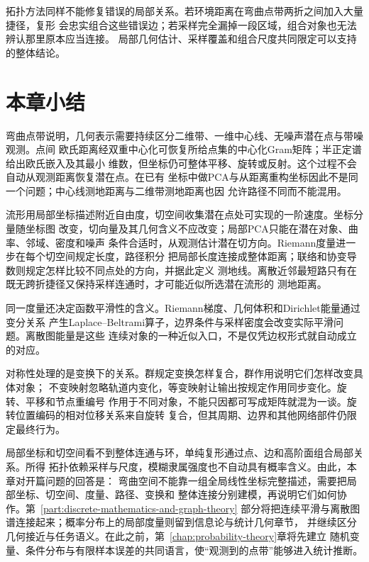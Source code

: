 拓扑方法同样不能修复错误的局部关系。若环境距离在弯曲点带两折之间加入大量捷径，复形
会忠实组合这些错误边；若采样完全漏掉一段区域，组合对象也无法辨认那里原本应当连接。
局部几何估计、采样覆盖和组合尺度共同限定可以支持的整体结论。

\section{本章小结}
\label{sec:geometry-summary}

弯曲点带说明，几何表示需要持续区分二维带、一维中心线、无噪声潜在点与带噪观测。点间
欧氏距离经双重中心化可恢复所给点集的中心化Gram矩阵；半正定谱给出欧氏嵌入及其最小
维数，但坐标仍可整体平移、旋转或反射。这个过程不会自动从观测距离恢复潜在点。在已有
坐标中做PCA与从距离重构坐标因此不是同一个问题；中心线测地距离与二维带测地距离也因
允许路径不同而不能混用。

流形用局部坐标描述附近自由度，切空间收集潜在点处可实现的一阶速度。坐标分量随坐标图
改变，切向量及其几何含义不应改变；局部PCA只能在潜在对象、曲率、邻域、密度和噪声
条件合适时，从观测估计潜在切方向。Riemann度量进一步在每个切空间规定长度，路径积分
把局部长度连接成整体距离；联络和协变导数则规定怎样比较不同点处的方向，并据此定义
测地线。离散近邻最短路只有在既无跨折捷径又保持采样连通时，才可能近似所选潜在流形的
测地距离。

同一度量还决定函数平滑性的含义。Riemann梯度、几何体积和Dirichlet能量通过变分关系
产生Laplace--Beltrami算子，边界条件与采样密度会改变实际平滑问题。离散图能量是这些
连续对象的一种近似入口，不是仅凭边权形式就自动成立的对应。

对称性处理的是变换下的关系。群规定变换怎样复合，群作用说明它们怎样改变具体对象；
不变映射忽略轨道内变化，等变映射让输出按规定作用同步变化。旋转、平移和节点重编号
作用于不同对象，不能只因都可写成矩阵就混为一谈。旋转位置编码的相对位移关系来自旋转
复合，但其周期、边界和其他网络部件仍限定最终行为。

局部坐标和切空间看不到整体连通与环，单纯复形通过点、边和高阶面组合局部关系。所得
拓扑依赖采样与尺度，模糊隶属强度也不自动具有概率含义。由此，本章对开篇问题的回答是：
弯曲空间不能靠一组全局线性坐标完整描述，需要把局部坐标、切空间、度量、路径、变换和
整体连接分别建模，再说明它们如何协作。第~\ref{part:discrete-mathematics-and-graph-theory}
部分将把连续平滑与离散图谱连接起来；概率分布上的局部度量则留到信息论与统计几何章节，
并继续区分几何接近与任务语义。在此之前，第~\ref{chap:probability-theory}章将先建立
随机变量、条件分布与有限样本误差的共同语言，使“观测到的点带”能够进入统计推断。
